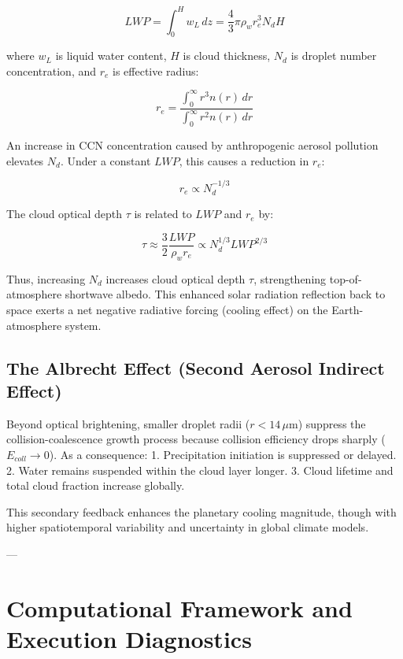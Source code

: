 \documentclass[12pt]{article}
\begin{document}
\begin{equation}
LWP = \int_{0}^{H} w_L \, dz = \frac{4}{3} \pi \rho_w r_e^3 N_{d} H
\end{equation}

where $w_L$ is liquid water content, $H$ is cloud thickness, $N_d$ is droplet number concentration, and $r_e$ is effective radius:

\begin{equation}
r_e = \frac{\int_{0}^{\infty} r^3 n(r) \, dr}{\int_{0}^{\infty} r^2 n(r) \, dr}
\end{equation}

An increase in CCN concentration caused by anthropogenic aerosol pollution elevates $N_d$. Under a constant $LWP$, this causes a reduction in $r_e$:

\begin{equation}
r_e \propto N_d^{-1/3}
\end{equation}

The cloud optical depth $\tau$ is related to $LWP$ and $r_e$ by:

\begin{equation}
\tau \approx \frac{3}{2} \frac{LWP}{\rho_w r_e} \propto N_d^{1/3} LWP^{2/3}
\end{equation}

Thus, increasing $N_d$ increases cloud optical depth $\tau$, strengthening top-of-atmosphere shortwave albedo. This enhanced solar radiation reflection back to space exerts a net negative radiative forcing (cooling effect) on the Earth-atmosphere system.

\subsection{The Albrecht Effect (Second Aerosol Indirect Effect)}
Beyond optical brightening, smaller droplet radii ($r < 14\,\mu\text{m}$) suppress the collision-coalescence growth process because collision efficiency drops sharply ($E_{coll} \to 0$). As a consequence:
1. Precipitation initiation is suppressed or delayed.
2. Water remains suspended within the cloud layer longer.
3. Cloud lifetime and total cloud fraction increase globally.

This secondary feedback enhances the planetary cooling magnitude, though with higher spatiotemporal variability and uncertainty in global climate models.

---

\section{Computational Framework and Execution Diagnostics}
\end{document}
